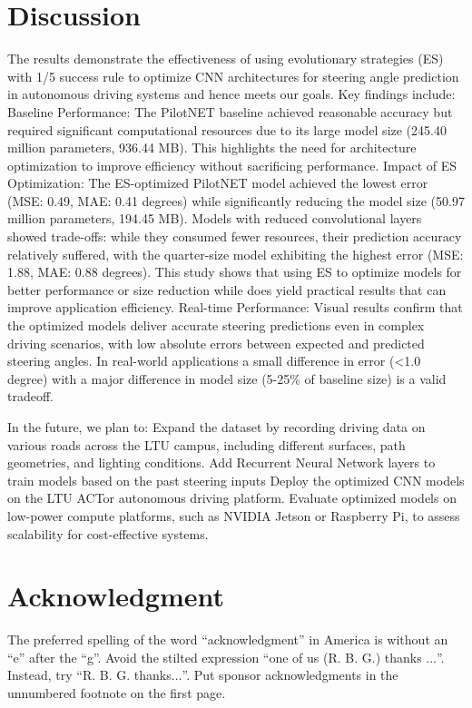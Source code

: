 \documentclass[conference]{IEEEtran}
\begin{document}
\section{Discussion}
The results demonstrate the effectiveness of using evolutionary strategies (ES) with 1/5 success rule to optimize CNN architectures for steering angle prediction in autonomous driving systems and hence meets our goals. Key findings include:
Baseline Performance: The PilotNET baseline achieved reasonable accuracy but required significant computational resources due to its large model size (245.40 million parameters, 936.44 MB).
This highlights the need for architecture optimization to improve efficiency without sacrificing performance.
Impact of ES Optimization: The ES-optimized PilotNET model achieved the lowest error (MSE: 0.49, MAE: 0.41 degrees) while significantly reducing the model size (50.97 million parameters, 194.45 MB). Models with reduced convolutional layers showed trade-offs: while they consumed fewer resources, their prediction accuracy relatively suffered, with the quarter-size model exhibiting the highest error (MSE: 1.88, MAE: 0.88 degrees). This study shows that using ES to optimize models for better performance or size reduction while does yield practical results that can improve application efficiency.
Real-time Performance: Visual results confirm that the optimized models deliver accurate steering predictions even in complex driving scenarios, with low absolute errors between expected and predicted steering angles. In real-world applications a small difference in error (<1.0 degree) with a major difference in model size (5-25\% of baseline size) is a valid tradeoff.

In the future, we plan to:
Expand the dataset by recording driving data on various roads across the LTU campus, including different surfaces, path geometries, and lighting conditions.
Add Recurrent Neural Network layers to train models based on the past steering inputs
Deploy the optimized CNN models on the LTU ACTor autonomous driving platform.
Evaluate optimized models on low-power compute platforms, such as NVIDIA Jetson or Raspberry Pi, to assess scalability for cost-effective systems.



\section*{Acknowledgment}

The preferred spelling of the word ``acknowledgment'' in America is without
an ``e'' after the ``g''. Avoid the stilted expression ``one of us (R. B.
G.) thanks $\ldots$''. Instead, try ``R. B. G. thanks$\ldots$''. Put sponsor
acknowledgments in the unnumbered footnote on the first page.
\end{document}
